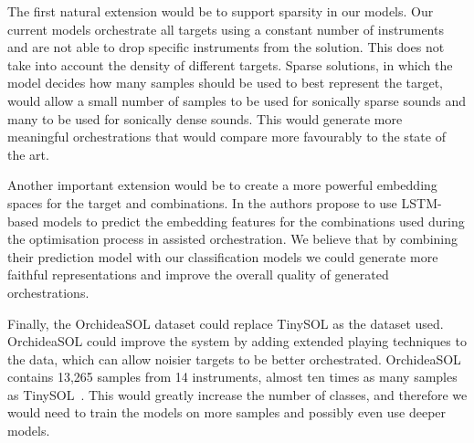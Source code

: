 \documentclass[runningheads,a4paper]{llncs}
\begin{document}
The first natural extension would be to support sparsity in our models. Our current models orchestrate all targets using a constant number of instruments and are not able to drop specific instruments from the solution. This does not take into account the density of different targets. Sparse solutions, in which the model decides how many samples should be used to best represent the target, would allow a small number of samples to be used for sonically sparse sounds and many to be used for sonically dense sounds. This would generate more meaningful orchestrations that would compare more favourably to the state of the art.

Another important extension would be to create a more powerful embedding spaces for the target and combinations. In \cite{Gillick19} the authors propose to use LSTM-based models to predict the embedding features for the combinations used during the optimisation process in assisted orchestration. We believe that by combining their prediction model with our classification models we could generate more faithful representations and improve the overall quality of generated orchestrations.

Finally, the OrchideaSOL dataset could replace TinySOL as the dataset used. OrchideaSOL could improve the system by adding extended playing techniques to the data, which can allow noisier targets to be better orchestrated. OrchideaSOL contains 13,265 samples from 14 instruments, almost ten times as many samples as TinySOL~\cite{Cella2020b}. This would greatly increase the number of classes, and therefore we would need to train the models on more samples and possibly even use deeper models. 




\end{document}
